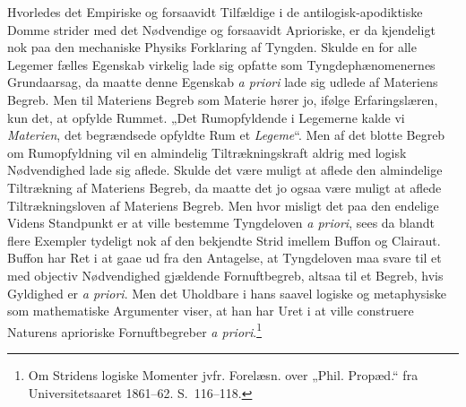 \documentclass[12pt]{book}
\begin{document}
Hvorledes det Empiriske og forsaavidt Tilfældige i de antilogisk-apodiktiske Domme strider med det Nødvendige og forsaavidt Aprioriske, er da kjendeligt nok paa den mechaniske Physiks Forklaring af Tyngden. Skulde en for alle Legemer fælles Egenskab virkelig lade sig opfatte som Tyngdephænomenernes Grundaarsag, da maatte denne Egenskab \textit{a priori} lade sig udlede af Materiens Begreb. Men til Materiens Begreb som Materie hører jo, ifølge Erfaringslæren, kun det, at opfylde Rummet. „Det Rumopfyldende i Legemerne kalde vi \emph{Materien}, det begrændsede opfyldte Rum et \emph{Legeme}“. Men af det blotte Begreb om Rumopfyldning vil en almindelig Tiltrækningskraft aldrig med logisk Nødvendighed lade sig aflede. Skulde det være muligt at aflede den almindelige Tiltrækning af Materiens Begreb, da maatte det jo ogsaa være muligt at aflede Tiltrækningsloven af Materiens Begreb. Men hvor misligt det paa den endelige Videns Standpunkt er at ville bestemme Tyngdeloven \textit{a priori}, sees da blandt flere Exempler tydeligt nok af den bekjendte Strid imellem Buffon og Clairaut. Buffon har Ret i at gaae ud fra den Antagelse, at Tyngdeloven maa svare til et med objectiv Nødvendighed gjældende Fornuftbegreb, altsaa til et Begreb, hvis Gyldighed er \textit{a priori}. Men det Uholdbare i hans saavel logiske og metaphysiske som mathematiske Argumenter viser, at han har Uret i at ville construere Naturens aprioriske Fornuftbegreber \textit{a priori}.\footnote{Om Stridens logiske Momenter jvfr. Forelæsn. over „Phil. Propæd.“ fra Universitetsaaret 1861--62. S.~116--118.}%
\end{document}
